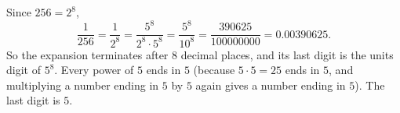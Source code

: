 Since $256=2^8$,
\[
\dfrac{1}{256}=\dfrac{1}{2^8}=\dfrac{5^8}{2^8\cdot5^8}=\dfrac{5^8}{10^8}=\dfrac{390625}{100000000}=0.00390625 .
\]
So the expansion terminates after $8$ decimal places, and its last digit is the units digit of $5^8$. Every power of $5$ ends in $5$ (because $5\cdot5=25$ ends in $5$, and multiplying a number ending in $5$ by $5$ again gives a number ending in $5$). The last digit is $\boxed{5}$.
